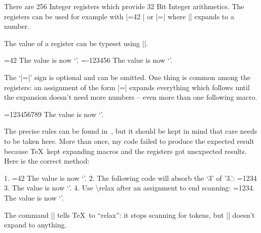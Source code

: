 \documentclass[a4paper,doc2]{ltxdoc}
\begin{document}
\begin{command}{\count{}}
	There are 256 Integer registers which provide 32 Bit Integer arithmetics. The registers can be used for example with |=42 | or |=\macro | where |\macro| expands to a number.

	The value of a register can be typeset using |\the|.
\begin{codeexample}[]
=42
The value is now `\the{}'.
\def\macro{-123456}
=\macro
The value is now `\the{}'.
\end{codeexample}

	The `|=|' sign is optional and can be omitted. One thing is common among the registers: an assignment of the form |=|\meta{$\cdots$} expands everything which follows until the expansion doesn't need more numbers -- even more than one following macro.
\begin{codeexample}[]
\def\firstmacro{123}
\def\secondmacro{456}
\def\thirdmacro{789}
=\firstmacro\secondmacro\thirdmacro
The value is now `\the{}'.
\end{codeexample}
 The precise rules can be found in~\cite{texbook}, but it should be kept in mind that care needs to be taken here. More than once, my code failed to produce the expected result because \TeX\ kept expanding macros and the registers got unexpected results. Here is the correct method:
\begin{codeexample}[]
1. =42 %
The value is now `\the{}'.
2. The following code will absorb the `3' of '3.':
\def\macro{1234}
=\macro %
3. The value is now `\the{}'.
4. Use \textbackslash relax after an assignment to end scanning:
=\macro{}. The value is now `\the{}'.
\end{codeexample}
	The command |\relax| tells \TeX\ to ``relax'': it stops scanning for tokens, but |\relax| doesn't expand to anything.
\end{command}
\end{document}
